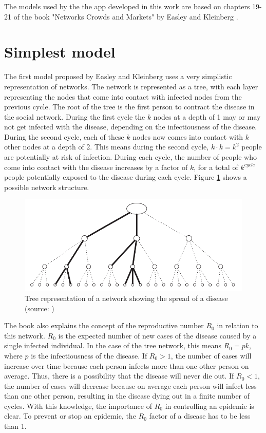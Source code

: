 The models used by the the app developed in this work are based on chapters 19-21 of the book
"Networks Crowds and Markets" by Easley and Kleinberg \cite{networks}.

\section{Simplest model}
The first model proposed by Easley and Kleinberg \cite{networks} uses a very simplistic
representation of networks. The network is represented as a tree, with each layer representing
the nodes that come into contact with infected nodes from the previous cycle. The root
of the tree is the first person to contract the disease in the social network. During the
first cycle the $k$ nodes at a depth of 1 may or may not get infected with the disease, depending
on the infectiousness of the disease. During the second cycle, each of these $k$ nodes
now comes into contact with $k$ other nodes at a depth of 2. This means during the second
cycle, $k \cdot k = k^2$ people are potentially at risk of infection. During each cycle, the
number of people who come into contact with the disease increases by a factor of $k$, for
a total of $k^{cycle}$ people potentially exposed to the disease during each cycle.
Figure \ref{fig:tree_network} shows a possible network structure.

\begin{figure}
    \centering
    \includegraphics[width=0.75\linewidth]{images/network_tree.png}
    \caption{Tree representation of a network showing the spread of a disease (source: \cite{networks})}
    \label{fig:tree_network}
\end{figure}

The book \cite{networks} also explains the concept of the reproductive number $R_0$ in
relation to this network. $R_0$ is the expected number of new cases of the disease
caused by a single infected individual. In the case of the tree network, this means 
$R_0 = pk$, where $p$ is the infectiousness of the disease. If $R_0 > 1$, the number
of cases will increase over time because each person infects more than one other person
on average. Thus, there is a possibility that the disease will never
die out. If $R_0 < 1$, the number of cases will decrease because on average each person will infect less
than one other person, resulting in the disease dying out in a finite number of cycles.
With this knowledge, the importance of $R_0$ in controlling an epidemic is clear. To prevent
or stop an epidemic, the $R_0$ factor of a disease has to be less than 1.

